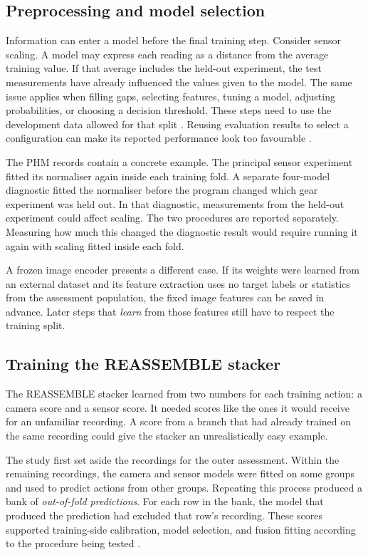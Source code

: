 \subsection{Preprocessing and model selection}

Information can enter a model before the final training step. Consider sensor scaling. A model may express each reading as a distance from the average training value. If that average includes the held-out experiment, the test measurements have already influenced the values given to the model. The same issue applies when filling gaps, selecting features, tuning a model, adjusting probabilities, or choosing a decision threshold. These steps need to use the development data allowed for that split \parencite{P017}. Reusing evaluation results to select a configuration can make its reported performance look too favourable \parencite{P004}.

The PHM records contain a concrete example. The principal sensor experiment fitted its normaliser again inside each training fold. A separate four-model diagnostic fitted the normaliser before the program changed which gear experiment was held out. In that diagnostic, measurements from the held-out experiment could affect scaling. The two procedures are reported separately. Measuring how much this changed the diagnostic result would require running it again with scaling fitted inside each fold.

A frozen image encoder presents a different case. If its weights were learned from an external dataset and its feature extraction uses no target labels or statistics from the assessment population, the fixed image features can be saved in advance. Later steps that \emph{learn} from those features still have to respect the training split.

\subsection{Training the REASSEMBLE stacker}

The REASSEMBLE stacker learned from two numbers for each training action: a camera score and a sensor score. It needed scores like the ones it would receive for an unfamiliar recording. A score from a branch that had already trained on the same recording could give the stacker an unrealistically easy example.

The study first set aside the recordings for the outer assessment. Within the remaining recordings, the camera and sensor models were fitted on some groups and used to predict actions from other groups. Repeating this process produced a bank of \emph{out-of-fold predictions}. For each row in the bank, the model that produced the prediction had excluded that row’s recording. These scores supported training-side calibration, model selection, and fusion fitting according to the procedure being tested \parencite{Ting1999Issues}.

